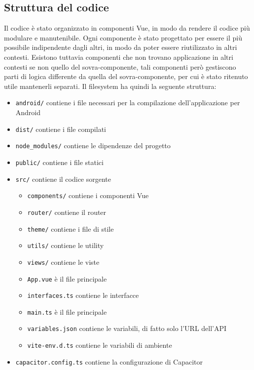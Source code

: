 \documentclass{article}
\begin{document}
\subsection{Struttura del codice}
Il codice è stato organizzato in componenti Vue, in modo da rendere il codice più modulare e manutenibile. Ogni componente è stato progettato per essere il più possibile indipendente dagli altri, in modo da poter essere riutilizzato in altri contesti. Esistono tuttavia componenti che non trovano applicazione in altri contesti se non quello del sovra-componente, tali componenti però gestiscono parti di logica differente da quella del sovra-componente, per cui è stato ritenuto utile mantenerli separati.
Il filesystem ha quindi la seguente struttura:
\begin{itemize}
    \item \texttt{android/} contiene i file necessari per la compilazione dell'applicazione per Android
    \item \texttt{dist/} contiene i file compilati
    \item \texttt{node\_modules/} contiene le dipendenze del progetto
    \item \texttt{public/} contiene i file statici
    \item \texttt{src/} contiene il codice sorgente
        \begin{itemize}
            \item \texttt{components/} contiene i componenti Vue
            \item \texttt{router/} contiene il router
            \item \texttt{theme/} contiene i file di stile
            \item \texttt{utils/} contiene le utility
            \item \texttt{views/} contiene le viste
            \item \texttt{App.vue} è il file principale
            \item \texttt{interfaces.ts} contiene le interfacce
            \item \texttt{main.ts} è il file principale
            \item \texttt{variables.json} contiene le variabili, di fatto solo l'URL dell'API
            \item \texttt{vite-env.d.ts} contiene le variabili di ambiente
        \end{itemize}
    \item \texttt{capacitor.config.ts} contiene la configurazione di Capacitor

\end{itemize}
\end{document}
